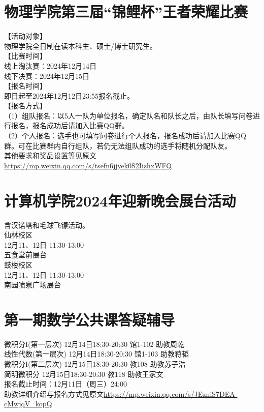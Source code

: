 \documentclass[letterpaper, 12pt]{article}
\begin{document}
\begin{multicols}{2}
\section{物理学院第三届“锦鲤杯”王者荣耀比赛}
【活动对象】\\
物理学院全日制在读本科生、硕士/博士研究生。\\
【比赛时间】\\
线上淘汰赛：2024年12月14日\\
线下决赛：2024年12月15日\\
【报名时间】\\
即日起至2024年12月12日23:55报名截止。\\
【报名方式】\\
（1）组队报名：以5人一队为单位报名，确定队名和队长之后，由队长填写问卷进行报名，报名成功后请加入比赛QQ群。\\
（2）个人报名：选手也可填写问卷进行个人报名，报名成功后请加入比赛QQ群。可在比赛群内自行组队，若仍无法组队成功的选手将随机分配队友。\\
其他要求和奖品设置等见原文\url{https://mp.weixin.qq.com/s/tsefn6jjyek0S2IizhxWFQ}

\section{计算机学院2024年迎新晚会展台活动}
含汉诺塔和毛球飞镖活动。\\
仙林校区\\
12月11、12日 11:30-13:00\\
五食堂前展台\\
鼓楼校区\\
12月11、12日 11:30-13:00\\
南园喷泉广场展台\\



\section{第一期数学公共课答疑辅导}
微积分I(第一层次) 12月14日18:30-20:30 馆1-102 助教周乾\\
线性代数(第一层次) 12月14日18:30-20:30 馆1-103 助教蒋韬\\
微积分I(第二层次) 12月15日18:30-20:30 教108 助教苏子浩\\
简明微积分 12月15日18:30-20:30 教118 助教王家文\\
报名截止时间：12月11日（周三）24:00\\
助教详细介绍与报名方式见原文\url{https://mp.weixin.qq.com/s/JEzniS7DEA-cMwjqV_kopQ}


\end{multicols}
\end{document}
